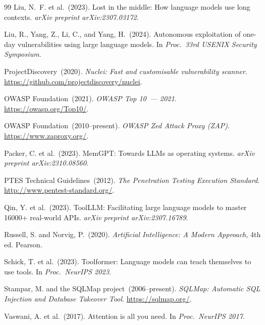\documentclass[12pt,a4paper,oneside,openany]{book}
\begin{document}
\begin{thebibliography}{99}
Liu, N.~F. et al.\ (2023).
Lost in the middle: How language models use long contexts.
\textit{arXiv preprint arXiv:2307.03172}.

Liu, R., Yang, Z., Li, C., and Yang, H.\ (2024).
Autonomous exploitation of one-day vulnerabilities using large language models.
In \textit{Proc.\ 33rd USENIX Security Symposium}.

ProjectDiscovery\ (2020).
\textit{Nuclei: Fast and customisable vulnerability scanner}.
\url{https://github.com/projectdiscovery/nuclei}.

OWASP Foundation\ (2021).
\textit{OWASP Top 10~--- 2021}.
\url{https://owasp.org/Top10/}.

OWASP Foundation\ (2010--present).
\textit{OWASP Zed Attack Proxy (ZAP)}.
\url{https://www.zaproxy.org/}.

Packer, C. et al.\ (2023).
MemGPT: Towards LLMs as operating systems.
\textit{arXiv preprint arXiv:2310.08560}.

PTES Technical Guidelines\ (2012).
\textit{The Penetration Testing Execution Standard}.
\url{http://www.pentest-standard.org/}.

Qin, Y. et al.\ (2023).
ToolLLM: Facilitating large language models to master 16000+ real-world APIs.
\textit{arXiv preprint arXiv:2307.16789}.

Russell, S. and Norvig, P.\ (2020).
\textit{Artificial Intelligence: A Modern Approach}, 4th ed.
Pearson.

Schick, T. et al.\ (2023).
Toolformer: Language models can teach themselves to use tools.
In \textit{Proc.\ NeurIPS 2023}.

Stampar, M. and the SQLMap project\ (2006--present).
\textit{SQLMap: Automatic SQL Injection and Database Takeover Tool}.
\url{https://sqlmap.org/}.

Vaswani, A. et al.\ (2017).
Attention is all you need.
In \textit{Proc.\ NeurIPS 2017}.


\end{thebibliography}
\end{document}
